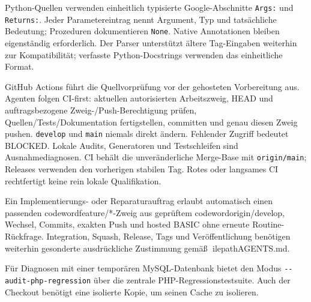 \documentclass[11pt,a4paper]{article}
\newcommand{\filepath}[1]{\path{#1}}
\newcommand{\codeword}[1]{\nolinkurl{#1}}
\begin{document}
Python-Quellen verwenden einheitlich typisierte Google-Abschnitte
\texttt{Args:} und \texttt{Returns:}. Jeder Parametereintrag nennt Argument,
Typ und tatsächliche Bedeutung; Prozeduren dokumentieren \texttt{None}.
Native Annotationen bleiben eigenständig erforderlich. Der Parser unterstützt
ältere Tag-Eingaben weiterhin zur Kompatibilität; verfasste Python-Docstrings
verwenden das einheitliche Format.

GitHub Actions führt die Quellvorprüfung vor der gehosteten Vorbereitung aus.
Agenten folgen CI-first: aktuellen autorisierten Arbeitszweig, HEAD und
auftragsbezogene Zweig-/Push-Berechtigung prüfen, Quellen/Tests/Dokumentation
fertigstellen, committen und genau diesen Zweig pushen. \codeword{develop} und
\codeword{main} niemals direkt ändern. Fehlender Zugriff bedeutet BLOCKED.
Lokale Audits, Generatoren und Testschleifen sind Ausnahmediagnosen. CI behält
die unveränderliche Merge-Base mit \codeword{origin/main}; Releases verwenden
den vorherigen stabilen Tag. Rotes oder langsames CI rechtfertigt keine rein
lokale Qualifikation.

Ein Implementierungs- oder Reparaturauftrag erlaubt automatisch einen passenden
codeword{feature/*}-Zweig aus geprüftem codeword{origin/develop}, Wechsel,
Commits, exakten Push und hosted BASIC ohne erneute Routine-Rückfrage.
Integration, Squash, Release, Tags und Veröffentlichung benötigen weiterhin
gesonderte ausdrückliche Zustimmung gemäß ilepath{AGENTS.md}.

Für Diagnosen mit einer temporären MySQL-Datenbank bietet
\filepath{scripts/gallery_workflow_mysql.php} den Modus
\codeword{--audit-php-regression} über die zentrale PHP-Regressionstestsuite.
Auch der Checkout benötigt eine isolierte Kopie, um seinen Cache zu isolieren.
\end{document}
